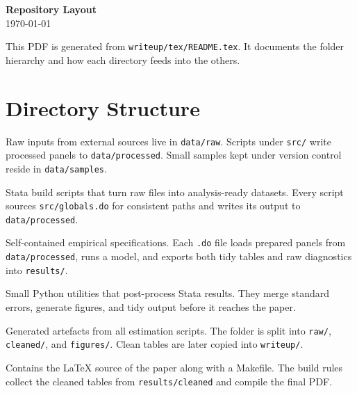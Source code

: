 \documentclass[11pt]{article}
\newcommand{\code}[1]{\texttt{#1}}
\begin{document}
\begin{center}
  {\LARGE \bf Repository Layout}\\[0.5em]
  \today
\end{center}

\vspace{1em}

This PDF is generated from \code{writeup/tex/README.tex}. It documents the
folder hierarchy and how each directory feeds into the others.

\tableofcontents
\newpage

\section{Directory Structure}

\begin{description}[style=unboxed,leftmargin=0.7in]
  \item[\code{data/}] Raw inputs from external sources live in
        \code{data/raw}. Scripts under \code{src/} write processed panels
        to \code{data/processed}. Small samples kept under version control
        reside in \code{data/samples}.

  \item[\code{src/}] Stata build scripts that turn raw files into
        analysis-ready datasets. Every script sources \code{src/globals.do}
        for consistent paths and writes its output to
        \code{data/processed}.

  \item[\code{spec/}] Self-contained empirical specifications. Each
        \code{.do} file loads prepared panels from \code{data/processed},
        runs a model, and exports both tidy tables and raw diagnostics into
        \code{results/}.

  \item[\code{scripts/}] Small Python utilities that post-process Stata
        results. They merge standard errors, generate figures, and tidy
        output before it reaches the paper.

  \item[\code{results/}] Generated artefacts from all estimation scripts.
        The folder is split into \code{raw/}, \code{cleaned/}, and
        \code{figures/}. Clean tables are later copied into
        \code{writeup/}.

  \item[\code{writeup/}] Contains the \LaTeX{} source of the paper along
        with a Makefile. The build rules collect the cleaned tables from
        \code{results/cleaned} and compile the final PDF.
\end{description}
\end{document}
